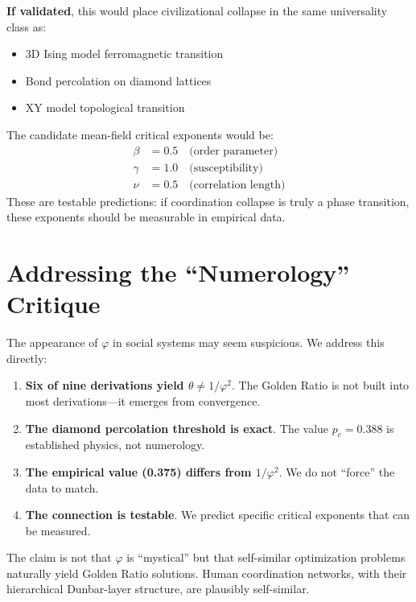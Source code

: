 \documentclass[11pt,twocolumn]{article}
\begin{document}
\textbf{If validated}, this would place civilizational collapse in the same universality class as:
\begin{itemize}
\item 3D Ising model ferromagnetic transition
\item Bond percolation on diamond lattices
\item XY model topological transition
\end{itemize}

The candidate mean-field critical exponents would be:
\begin{align}
\beta &= 0.5 \quad \text{(order parameter)} \\
\gamma &= 1.0 \quad \text{(susceptibility)} \\
\nu &= 0.5 \quad \text{(correlation length)}
\end{align}
These are testable predictions: if coordination collapse is truly a phase transition, these exponents should be measurable in empirical data.

\section{Addressing the ``Numerology'' Critique}

The appearance of $\varphi$ in social systems may seem suspicious. We address this directly:

\begin{enumerate}
\item \textbf{Six of nine derivations yield $\theta \neq 1/\varphi^2$}. The Golden Ratio is not built into most derivations---it emerges from convergence.

\item \textbf{The diamond percolation threshold is exact}. The value $p_c = 0.388$ is established physics, not numerology.

\item \textbf{The empirical value (0.375) differs from $1/\varphi^2$}. We do not ``force'' the data to match.

\item \textbf{The connection is testable}. We predict specific critical exponents that can be measured.
\end{enumerate}

The claim is not that $\varphi$ is ``mystical'' but that self-similar optimization problems naturally yield Golden Ratio solutions. Human coordination networks, with their hierarchical Dunbar-layer structure, are plausibly self-similar.
\end{document}
